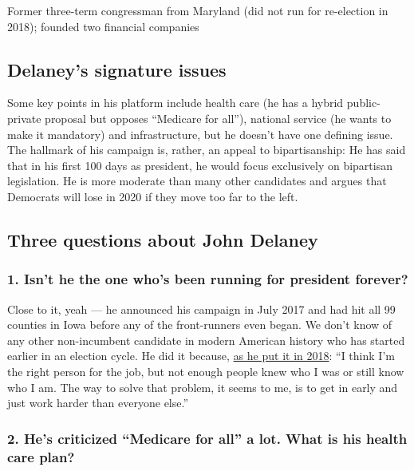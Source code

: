 Former three-term congressman from Maryland (did not run for re-election
in 2018); founded two financial companies

\hypertarget{delaneys-signature-issues}{%
\subsection{Delaney's signature
issues}\label{delaneys-signature-issues}}

Some key points in his platform include health care (he has a hybrid
public-private proposal but opposes ``Medicare for all''), national
service (he wants to make it mandatory) and infrastructure, but he
doesn't have one defining issue. The hallmark of his campaign is,
rather, an appeal to bipartisanship: He has said that in his first 100
days as president, he would focus exclusively on bipartisan legislation.
He is more moderate than many other candidates and argues that Democrats
will lose in 2020 if they move too far to the left.

\hypertarget{three-questions-about-john-delaney}{%
\subsection{Three questions about John
Delaney}\label{three-questions-about-john-delaney}}

\hypertarget{1-isnt-he-the-one-whos-been-running-for-president-forever}{%
\subsubsection{\texorpdfstring{\textbf{1. Isn't he the one who's been
running for president
forever?}}{1. Isn't he the one who's been running for president forever?}}\label{1-isnt-he-the-one-whos-been-running-for-president-forever}}

Close to it, yeah --- he announced his campaign in July 2017 and had hit
all 99 counties in Iowa before any of the front-runners even began. We
don't know of any other non-incumbent candidate in modern American
history who has started earlier in an election cycle. He did it because,
\href{https://www.nytimes.com/2018/11/10/us/politics/john-delaney-2020-iowa.html}{as
he put it in 2018}: ``I think I'm the right person for the job, but not
enough people knew who I was or still know who I am. The way to solve
that problem, it seems to me, is to get in early and just work harder
than everyone else.''

\hypertarget{2-hes-criticized-medicare-for-all-a-lot-what-is-his-health-care-plan}{%
\subsubsection{\texorpdfstring{\textbf{2. He's criticized ``Medicare for
all'' a lot. What is his health care
plan?}}{2. He's criticized ``Medicare for all'' a lot. What is his health care plan?}}\label{2-hes-criticized-medicare-for-all-a-lot-what-is-his-health-care-plan}}

